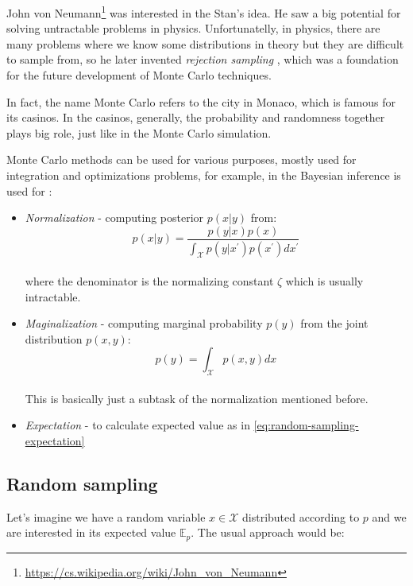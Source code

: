\documentclass[
  digital, %
  oneside, %
  lof,     %
  lot,     %
]{fithesis4}
\begin{document}
John von Neumann\footnote{\url{https://cs.wikipedia.org/wiki/John_von_Neumann}}
was interested in the Stan's idea. He saw a big potential for
solving untractable problems in physics.
Unfortunatelly, in physics, there are many problems where
we know some distributions in theory but they are difficult
to sample from, so he later invented 
\textit{rejection sampling} \cite{beichl2000}, which 
was a foundation for the future development of 
Monte Carlo techniques.

In fact, the name Monte Carlo refers to the city 
in Monaco, which is famous for its casinos. 
In the casinos, generally, the probability and 
randomness together plays big role, just like in the 
Monte Carlo simulation.

Monte Carlo methods can be used for various 
purposes, mostly used for integration and
optimizations problems,
for example, in the Bayesian inference is used for \cite{andrieu2003}:

\begin{itemize}
  \item \textit{Normalization} - computing posterior $p(x | y)$ from:
    \begin{equation}
      p(x | y) = \frac{p(y | x) p(x)}{\int_{\mathcal{X}} p(y | x^\prime) p(x^\prime) dx^\prime}
    \end{equation} \\
    where the denominator is the normalizing constant $\zeta$ which is usually intractable.
  \item \textit{Maginalization} - computing marginal probability $p(y)$ from the joint distribution $p(x, y)$:
    \begin{equation}
      p(y) = \int_{\mathcal{X}} p(x, y) dx
    \end{equation} \\
    This is basically just a subtask of the normalization mentioned before.
  \item \textit{Expectation} - to calculate expected value as in \eqref{eq:random-sampling-expectation}
\end{itemize}

\subsection{Random sampling}

Let's imagine we have a random variable 
$x \in \mathcal{X}$ distributed according to 
$p$ and we are interested in its expected 
value $\mathbb{E}_p$. 
The usual approach would be:
\end{document}

